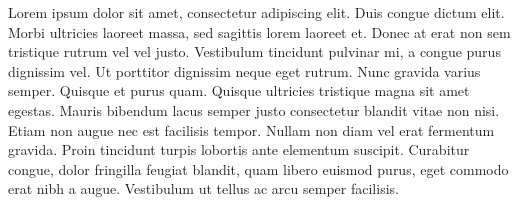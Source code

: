 \documentclass{scrartcl}
\begin{document}
Lorem ipsum dolor sit amet, consectetur adipiscing elit. Duis congue dictum elit. Morbi ultricies laoreet massa, sed sagittis lorem laoreet et. Donec at erat non sem tristique rutrum vel vel justo. Vestibulum tincidunt pulvinar mi, a congue purus dignissim vel. Ut porttitor dignissim neque eget rutrum. Nunc gravida varius semper. Quisque et purus quam. Quisque ultricies tristique magna sit amet egestas. Mauris bibendum lacus semper justo consectetur blandit vitae non nisi. Etiam non augue nec est facilisis tempor. Nullam non diam vel erat fermentum gravida. Proin tincidunt turpis lobortis ante elementum suscipit. Curabitur congue, dolor fringilla feugiat blandit, quam libero euismod purus, eget commodo erat nibh a augue. Vestibulum ut tellus ac arcu semper facilisis.
\end{document}
